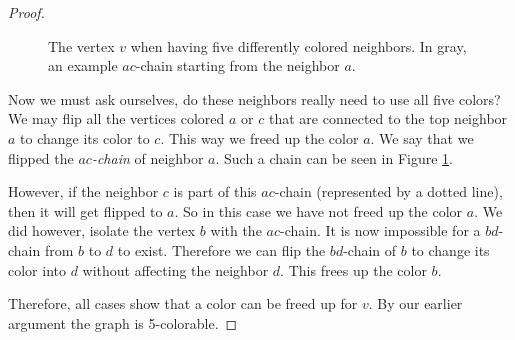 \begin{proof}
\begin{figure}[!h]
    \label{fig:5colthm}
    \caption{The vertex $v$ when having five differently colored neighbors. In gray, an example $ac$-chain starting from the neighbor $a$. }
\end{figure}

Now we must ask ourselves, do these neighbors really need to use all five colors?
We may flip all the vertices colored $a$ or $c$ that are connected to the top neighbor $a$ to change its color to $c$. This way we freed up the color $a$. We say that we flipped the $ac$\textit{-chain} of neighbor $a$. Such a chain can be seen in Figure \ref{fig:5colthm}.

However, if the neighbor $c$ is part of this $ac$-chain (represented by a dotted line), then it will get flipped to $a$. So in this case we have not freed up the color $a$. We did however, isolate the vertex $b$ with the $ac$-chain. It is now impossible for a $bd$-chain from $b$ to $d$ to exist. Therefore we can flip the $bd$-chain of  $b$ to change its color into $d$ without affecting the neighbor $d$. This frees up the color $b$.

Therefore, all cases show that a color can be freed up for $v$. By our earlier argument the graph is 5-colorable.
\end{proof}
